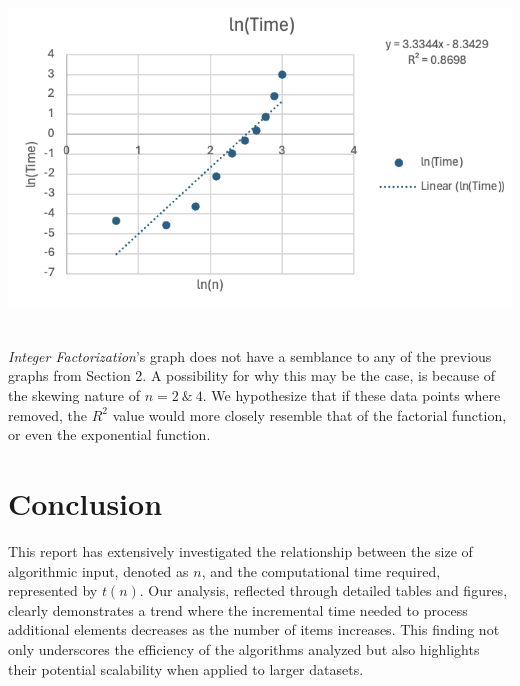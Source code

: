 \documentclass{article}
\begin{document}
\begin{minipage}{0.6\textwidth} %

    

    \centering
    \includegraphics[width=1\linewidth]{Graphs/Integer.png} %

     
    
\end{minipage}\\

    \textit{Integer Factorization}'s graph does not have a semblance to any of the previous graphs from Section 2. A possibility for why this may be the case, is because of the skewing nature of $n = 2 \ \& \ 4$. We hypothesize that if these data points where removed, the $R^2$ value would more closely resemble that of the factorial function, or even the exponential function.



    

\section{Conclusion}

    This report has extensively investigated the relationship between the size of algorithmic input, denoted as $n$, and the computational time required, represented by $t(n)$. Our analysis, reflected through detailed tables and figures, clearly demonstrates a trend where the incremental time needed to process additional elements decreases as the number of items increases. This finding not only underscores the efficiency of the algorithms analyzed but also highlights their potential scalability when applied to larger datasets.
\end{document}
